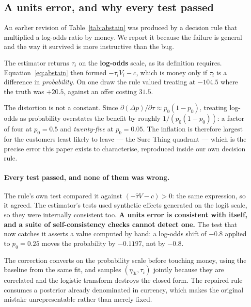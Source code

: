 \documentclass[11pt,a4paper]{article}
\newcommand{\CATE}{\tau}
\begin{document}
\subsection{A units error, and why every test passed}
\label{sec:units}

An earlier revision of Table~\ref{tab:abstain} was produced by a decision rule that
multiplied a log-odds ratio by money. We report it because the failure is general and
the way it survived is more instructive than the bug.

The estimator returns $\CATE_i$ on the \textbf{log-odds} scale, as its definition
requires. Equation~\eqref{eq:abstain} then formed $-\CATE_i V_i - c$, which is money
only if $\CATE_i$ is a difference in \emph{probability}. On one draw the rule valued
treating at $-104.5$ where the truth was $+20.5$, against an offer costing $31.5$.

The distortion is not a constant. Since
$\partial(\Delta p)/\partial\CATE \approx p_0(1-p_0)$, treating log-odds as probability
overstates the benefit by roughly $1/(p_0(1-p_0))$: a factor of four at $p_0 = 0.5$ and
\emph{twenty-five} at $p_0 = 0.05$. The inflation is therefore largest for the customers
least likely to leave --- the Sure Thing quadrant --- which is the precise error this
paper exists to characterise, reproduced inside our own decision rule.

\paragraph{Every test passed, and none of them was wrong.} The rule's own test compared
it against $(-\hat\CATE V - c) > 0$: the same expression, so it agreed. The estimator's
tests used synthetic effects generated on the logit scale, so they were internally
consistent too. \textbf{A units error is consistent with itself, and a suite of
self-consistency checks cannot detect one.} The test that now catches it asserts a value
computed by hand: a log-odds shift of $-0.8$ applied to $p_0 = 0.25$ moves the
probability by $-0.1197$, not by $-0.8$.

The correction converts on the probability scale before touching money, using the
baseline from the same fit, and samples $(\eta_{0i}, \CATE_i)$ jointly because they are
correlated and the logistic transform destroys the closed form. The repaired rule
consumes a posterior already denominated in currency, which makes the original mistake
unrepresentable rather than merely fixed.
\end{document}
